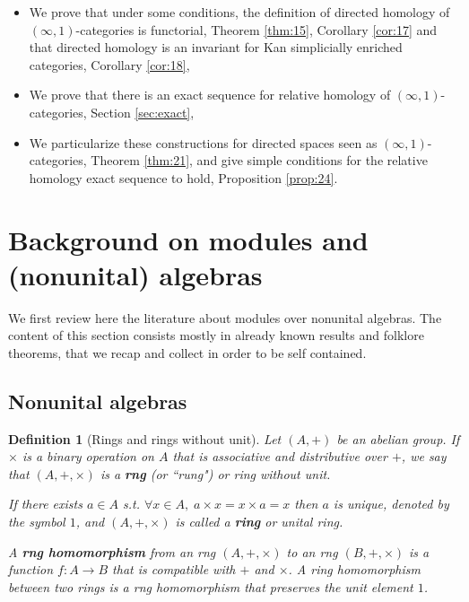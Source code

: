 \documentclass[a4paper,fleqn]{cas-sc}
\newtheorem{dfnt}{Definition}%
\begin{document}
\begin{itemize}
\item We prove that under some conditions, the definition of directed homology of $(\infty,1)$-categories is functorial, Theorem \ref{thm:15}, Corollary \ref{cor:17} and that directed homology is an invariant for Kan simplicially enriched categories, Corollary \ref{cor:18},
\item We prove that there is an exact sequence for relative homology of $(\infty,1)$-categories, Section \ref{sec:exact},
\item We particularize these constructions for directed spaces seen as $(\infty,1)$-categories, Theorem \ref{thm:21}, and give simple conditions for the relative homology exact sequence to hold, Proposition \ref{prop:24}.
\end{itemize}


\section{Background on modules and (nonunital) algebras}

\label{sec:background}

We first 
review here the literature about modules over nonunital algebras. The content of this section consists mostly in already known results and folklore theorems, that we recap and collect in order to be self contained. 

\subsection{Nonunital algebras}

\begin{dfnt}[Rings and rings without unit]
Let $(A,+)$ be an abelian group. If $\times$ is a binary operation on $A$ that is associative and distributive over $+$, we say that $(A,+,\times)$ is a \textbf{rng} (or ``rung") %
or ring without unit. 

If there exists $a \in A$ s.t. $\forall x \in A, \; a\times x = x \times a = x$ then $a$ is unique, denoted by the symbol $1$, and $(A,+ , \times)$ is called a \textbf{ring} or unital ring.  

A \textbf{rng homomorphism} from an rng $(A,+,\times)$ to an rng $(B,+, \times)$ is a function $f: A \to B$ that is compatible with $+$ and $\times$. A ring homomorphism between two rings is a rng homomorphism that preserves the unit element $1$.
\end{dfnt}
\end{document}
